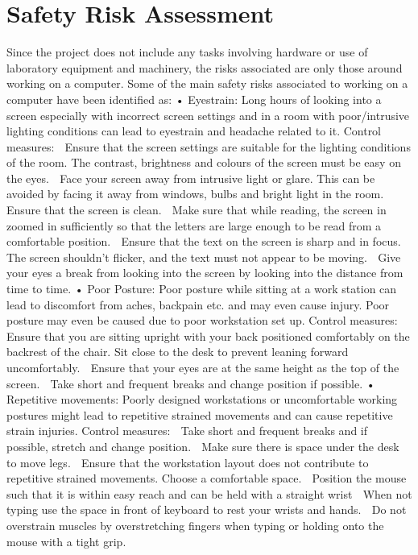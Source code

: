 \documentclass[a4paper,12pt]{report}
\begin{document}
\section{Safety Risk Assessment}
Since the project does not include any tasks involving hardware or use of laboratory equipment and machinery, the risks associated are only those around working on a computer. Some of the main safety risks associated to working on a computer have been identified as:
•	Eyestrain: Long hours of looking into a screen especially with incorrect screen settings and in a room with poor/intrusive lighting conditions can lead to eyestrain and headache related to it.
Control measures:
	Ensure that the screen settings are suitable for the lighting conditions of the room. The contrast, brightness and colours of the screen must be easy on the eyes.
	Face your screen away from intrusive light or glare. This can be avoided by facing it away from windows, bulbs and bright light in the room.
	Ensure that the screen is clean.
	Make sure that while reading, the screen in zoomed in sufficiently so that the letters are large enough to be read from a comfortable position.
	Ensure that the text on the screen is sharp and in focus. The screen shouldn’t flicker, and the text must not appear to be moving.
	Give your eyes a break from looking into the screen by looking into the distance from time to time.
•	Poor Posture: Poor posture while sitting at a work station can lead to discomfort from aches, backpain etc. and may even cause injury. Poor posture may even be caused due to poor workstation set up.
Control measures:
	Ensure that you are sitting upright with your back positioned comfortably on the backrest of the chair. Sit close to the desk to prevent leaning forward uncomfortably.
	Ensure that your eyes are at the same height as the top of the screen.
	Take short and frequent breaks and change position if possible.
•	Repetitive movements: Poorly designed workstations or uncomfortable working postures might lead to repetitive strained movements and can cause repetitive strain injuries.
Control measures:
	Take short and frequent breaks and if possible, stretch and change position.
	Make sure there is space under the desk to move legs.
	Ensure that the workstation layout does not contribute to repetitive strained movements. Choose a comfortable space.
	Position the mouse such that it is within easy reach and can be held with a straight wrist
	When not typing use the space in front of keyboard to rest your wrists and hands.
	Do not overstrain muscles by overstretching fingers when typing or holding onto the mouse with a tight grip.
\end{document}
